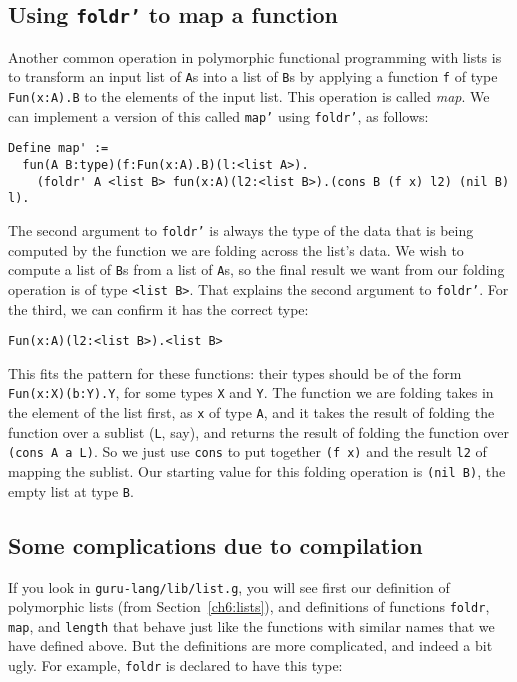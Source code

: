 \documentclass{book}[12pt]
\begin{document}
\subsection{Using \texttt{foldr'} to map a function}

Another common operation in polymorphic functional programming with
lists is to transform an input list of \texttt{A}s into a list of
\texttt{B}s by applying a function \texttt{f} of type
\texttt{Fun(x:A).B} to the elements of the input list.  This operation
is called \emph{map}.  We can implement a version of this called
\texttt{map'} using \texttt{foldr'}, as follows:

\begin{verbatim}
Define map' := 
  fun(A B:type)(f:Fun(x:A).B)(l:<list A>).
    (foldr' A <list B> fun(x:A)(l2:<list B>).(cons B (f x) l2) (nil B) l).
\end{verbatim}

\noindent The second argument to \texttt{foldr'} is always the type of
the data that is being computed by the function we are folding across the
list's data.  We wish to compute a list of \texttt{B}s from a list of \texttt{A}s,
so the final result we want from our folding operation is of type \texttt{<list B>}.
That explains the second argument to \texttt{foldr'}.  For the third, we can confirm
it has the correct type:

\begin{verbatim}
Fun(x:A)(l2:<list B>).<list B>
\end{verbatim}

\noindent This fits the pattern for these functions: their types
should be of the form \texttt{Fun(x:X)(b:Y).Y}, for some types
\texttt{X} and \texttt{Y}.  The function we are folding takes in the
element of the list first, as \texttt{x} of type \texttt{A}, and it
takes the result of folding the function over a sublist (\texttt{L},
say), and returns the result of folding the function over
\texttt{(cons A a L)}.  So we just use \texttt{cons} to put together
\texttt{(f x)} and the result \texttt{l2} of mapping the sublist.
Our starting value for this folding operation is \texttt{(nil B)},
the empty list at type \texttt{B}.

\subsection{Some complications due to compilation}
\label{ch6:compile}

If you look in \texttt{guru-lang/lib/list.g}, you will see first our
definition of polymorphic lists (from Section~\ref{ch6:lists}), and
definitions of functions \texttt{foldr}, \texttt{map}, and
\texttt{length} that behave just like the functions with similar names
that we have defined above.  But the definitions are more complicated,
and indeed a bit ugly.  For example, \texttt{foldr} is declared to
have this type:
\end{document}
